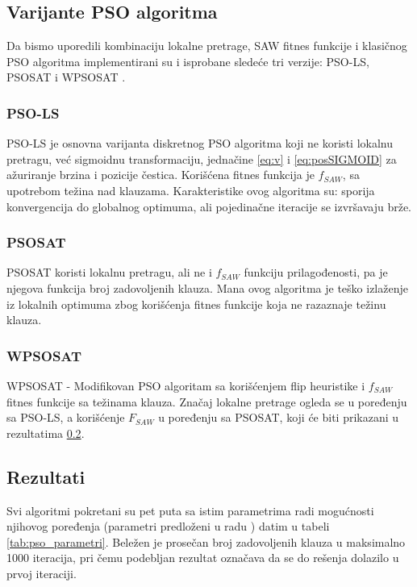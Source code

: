\documentclass[a4paper]{article}
\begin{document}
\subsection{Varijante PSO algoritma}
\label{sec:pso_varijante}
Da bismo uporedili kombinaciju lokalne pretrage, SAW fitnes funkcije i
klasičnog PSO algoritma implementirani su i isprobane sledeće tri verzije: 
PSO-LS, PSOSAT i WPSOSAT \cite{pso_layeb}.

\subsubsection{PSO-LS}
\label{sec:psols}
PSO-LS je osnovna varijanta diskretnog PSO algoritma koji ne koristi lokalnu pretragu, 
već sigmoidnu transformaciju, jednačine \ref{eq:v} i \ref{eq:posSIGMOID} 
za ažuriranje brzina i pozicije čestica. Korišćena fitnes funkcija je $f_{SAW}$, 
sa upotrebom težina nad klauzama. 
Karakteristike ovog algoritma su: sporija konvergencija do globalnog optimuma, 
ali pojedinačne iteracije se izvršavaju brže.

\subsubsection{PSOSAT}
\label{sec:psosat}
PSOSAT koristi lokalnu pretragu, ali ne i $f_{SAW}$ funkciju prilagođenosti, 
pa je njegova funkcija broj zadovoljenih klauza. Mana ovog algoritma je teško izlaženje
iz lokalnih optimuma zbog korišćenja fitnes funkcije koja ne razaznaje težinu klauza.

\subsubsection{WPSOSAT}
\label{sec:wpsosat}
WPSOSAT - Modifikovan PSO algoritam sa korišćenjem flip heuristike i $f_{SAW}$ fitnes
funkcije sa težinama klauza. Značaj lokalne pretrage ogleda se u poređenju sa PSO-LS, 
a korišćenje $F_{SAW}$ u poređenju sa PSOSAT, koji će biti prikazani u rezultatima 
\ref{sec:pso_rezultati}.


\subsection{Rezultati}
\label{sec:pso_rezultati}
Svi algoritmi pokretani su pet puta sa istim parametrima radi mogućnosti njihovog
poređenja (parametri predloženi u radu \cite{pso_layeb}) datim u tabeli
\ref{tab:pso_parametri}. 
Beležen je prosečan broj zadovoljenih klauza u maksimalno 1000 iteracija,
pri čemu podebljan rezultat označava da se do rešenja dolazilo u
prvoj iteraciji.\\
\end{document}
